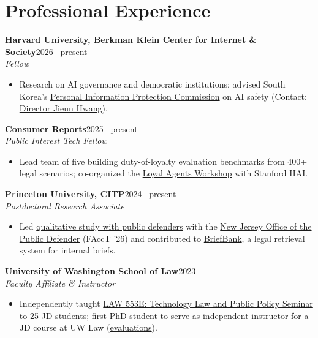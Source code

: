 \documentclass[10pt]{article}
\newcommand{\employer}[3]{%
  {\textbf{#1}\hfill\textnormal{#2}}\\
  \textit{#3}%
}
\begin{document}


\section*{Professional Experience}
\employer{Harvard University, Berkman Klein Center for Internet \& Society}{2026\,--\,present}{Fellow \href{https://cyber.harvard.edu/}{\faLink}}
\begin{itemize}
\item Research on AI governance and democratic institutions; advised South Korea's \href{https://pipc.go.kr/eng/index.do}{Personal Information Protection Commission} on AI safety (Contact: \href{https://www.linkedin.com/in/jieun-hwang-17a322374/}{Director Jieun Hwang}).
\end{itemize}

\vspace{3pt}
\employer{Consumer Reports}{2025\,--\,present}{Public Interest Tech Fellow \href{https://innovation.consumerreports.org/2025-public-interest-tech-fellows/}{\faLink}}
\begin{itemize}
\item Lead team of five building duty-of-loyalty evaluation benchmarks from 400+ legal scenarios; co-organized the \href{https://loyalagents.org/}{Loyal Agents Workshop} with Stanford HAI.
\end{itemize}

\vspace{3pt}
\employer{Princeton University, CITP}{2024\,--\,present}{Postdoctoral Research Associate \href{https://citp.princeton.edu/citp-people/inyoung-cheong/}{\faLink}}
\begin{itemize}
\item Led \href{https://sites.google.com/princeton.edu/ai-for-public-defenders}{qualitative study with public defenders} with the \href{https://www.nj.gov/defender/}{New Jersey Office of the Public Defender} (FAccT '26) and contributed to \href{https://www.justicebench.org/project/pd-brief-bank}{BriefBank}, a legal retrieval system for internal briefs.
\end{itemize}

\vspace{3pt}
\employer{University of Washington School of Law}{2023}{Faculty Affiliate \& Instructor \href{https://www.law.uw.edu/directory/affiliate-faculty/cheong-inyoung/}{\faLink}}
\begin{itemize}
\item Independently taught \href{https://inyoungcheong.github.io/lawe553}{LAW 553E: Technology Law and Public Policy Seminar} to 25 JD students; first PhD student to serve as independent instructor for a JD course at UW Law (\href{https://inyoungcheong.github.io/assets/pdf/Eval_WI23.pdf}{evaluations}).
\end{itemize}
\end{document}
